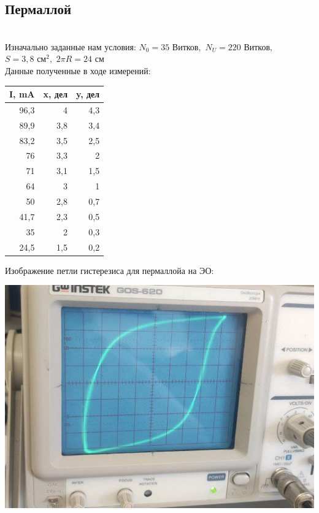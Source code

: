 \documentclass[a4paper, 12pt]{article}
\begin{document}
\subsection{Пермаллой}
\\ Изначально заданные нам условия: 
    $N_0 = 35 \text{ Витков},$ $ N_U = 220 \text{ Витков}, $ $ S = 3,8 \text{ см}^2, $ $ 2 \pi R = 24 \text{ см}$ \\
Данные полученные в ходе измерений:
\begin{center}
\begin{tabular}{|r|r|r|}
\hline
\multicolumn{1}{|l|}{I, mA} & \multicolumn{1}{l|}{x, дел} & \multicolumn{1}{l|}{y, дел} \\ \hline
96,3                        & 4                           & 4,3                         \\ \hline
89,9                        & 3,8                         & 3,4                         \\ \hline
83,2                        & 3,5                         & 2,5                         \\ \hline
76                          & 3,3                         & 2                           \\ \hline
71                          & 3,1                         & 1,5                         \\ \hline
64                          & 3                           & 1                           \\ \hline
50                          & 2,8                         & 0,7                         \\ \hline
41,7                        & 2,3                         & 0,5                         \\ \hline
35                          & 2                           & 0,3                         \\ \hline
24,5                        & 1,5                         & 0,2                         \\ \hline
\end{tabular}
\end{center}
Изображение петли гистерезиса для пермаллойа на ЭО:
\begin{center}
    \includegraphics[width=0.5\linewidth]{Permalloy.jpg}
    \caption{}
    \label{fig:enter-label}
\end{center}
\end{document}
